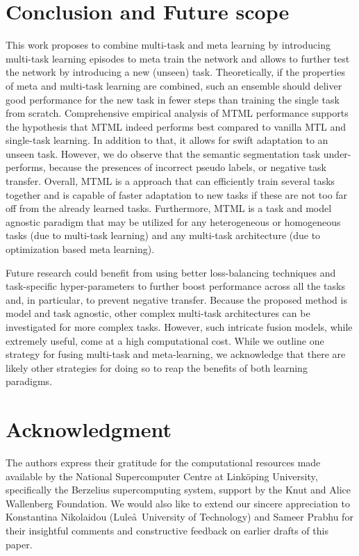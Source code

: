 \documentclass[conference]{IEEEtran}
\begin{document}
  





 

\section{Conclusion and Future scope}
This work proposes to combine multi-task and meta learning by introducing multi-task learning episodes to meta train the network and allows to further test the network by introducing a new (unseen) task. 
Theoretically, if the properties of meta and multi-task learning are combined, such an ensemble should deliver good performance for the new task in fewer steps than training the single task from scratch.
Comprehensive empirical analysis of \ac{MTML} performance supports the hypothesis that \ac{MTML} indeed performs best compared to vanilla \ac{MTL} and single-task learning. 
In addition to that, it allows for swift adaptation to an unseen task.
However, we do observe that the semantic segmentation task under-performs, because the presences of incorrect pseudo labels, or negative task transfer. 
Overall, \ac{MTML} is a approach that can efficiently train several tasks together and is capable of faster adaptation to new tasks if these are not too far off from the already learned tasks.  
Furthermore, MTML is a task and model agnostic paradigm that may be utilized for any heterogeneous or homogeneous tasks (due to multi-task learning) and any multi-task architecture (due to optimization based meta learning).

Future research could benefit from using better loss-balancing techniques and task-specific hyper-parameters to further boost performance across all the tasks and, in particular, to prevent negative transfer.
Because the proposed method is model and task agnostic, other complex multi-task architectures can be investigated for more complex tasks.
However, such intricate fusion models, while extremely useful, come at a high computational cost.
While we outline one strategy for fusing multi-task and meta-learning, we acknowledge that there are likely other strategies for doing so to reap the benefits of both learning paradigms.





%
 \section*{Acknowledgment}
The authors express their gratitude for the computational resources made available by the National Supercomputer Centre at Link\"{o}ping University, specifically the Berzelius supercomputing system, support by the Knut and Alice Wallenberg Foundation. 
We would also like to extend our sincere appreciation to Konstantina Nikolaidou (Lule\aa~University of Technology) and Sameer Prabhu for their insightful comments and constructive feedback on earlier drafts of this paper.


\end{document}
